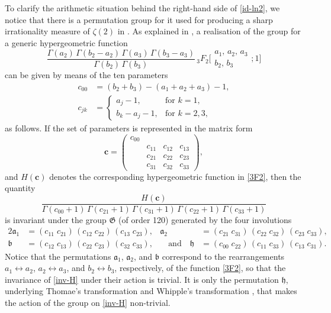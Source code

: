 \documentclass[12pt,reqno]{amsart}
\newcommand{\bc}{{\boldsymbol c}}
\newcommand{\fa}{{\mathfrak a}}
\newcommand{\fb}{{\mathfrak b}}
\newcommand{\fh}{{\mathfrak h}}
\newcommand{\fG}{{\mathfrak G}}
\begin{document}
To clarify the arithmetic situation behind the right-hand side of \eqref{id-ln2}, we notice that there is a permutation group for it
used for producing a sharp irrationality measure of $\zeta(2)$ in \cite{RV96}. As explained in \cite[Section~6]{Zu04},
a realisation of the group for a generic hypergeometric function
\begin{equation}
\frac{\Gamma(a_2)\,\Gamma(b_2-a_2)\,\Gamma(a_3)\,\Gamma(b_3-a_3)}{\Gamma(b_2)\,\Gamma(b_3)}
\,{}_3F_2\biggl[\begin{matrix} a_1, \, a_2, \, a_3 \\ b_2, \, b_3 \end{matrix}; 1\biggr]
\label{3F2}
\end{equation}
can be given by means of the ten parameters
\begin{align*}
c_{00}&=(b_2+b_3)-(a_1+a_2+a_3)-1,
\\
c_{jk}&=\begin{cases}
a_j-1, & \text{for }k=1, \\
b_k-a_j-1, & \text{for } k=2,3,
\end{cases}
\end{align*}
as follows. If the set of parameters is represented in the matrix form
\begin{equation}
\bc=\begin{pmatrix} c_{00} \\ & c_{11} & c_{12} & c_{13} \\ & c_{21} & c_{22} & c_{23} \\ & c_{31} & c_{32} & c_{33} \end{pmatrix},
\label{bc}
\end{equation}
and $H(\bc)$ denotes the corresponding hypergeometric function in \eqref{3F2}, then the quantity
\begin{equation}
\frac{H(\bc)}{\Gamma(c_{00}+1)\,\Gamma(c_{21}+1)\,\Gamma(c_{31}+1)\,\Gamma(c_{22}+1)\,\Gamma(c_{33}+1)}
\label{inv-H}
\end{equation}
is invariant under the group $\fG$ (of order 120) generated by the four involutions
\begin{alignat*}{2}
\fa_1&=(c_{11} \; c_{21})\,(c_{12} \; c_{22})\,(c_{13} \; c_{23}), &
\fa_2&=(c_{21} \; c_{31})\,(c_{22} \; c_{32})\,(c_{23} \; c_{33}), \\
\fb&=(c_{12} \; c_{13})\,(c_{22} \; c_{23})\,(c_{32} \; c_{33}), &\quad\text{and}\quad
\fh&=(c_{00} \; c_{22})\,(c_{11} \; c_{33})\,(c_{13} \; c_{31}).
\end{alignat*}
Notice that the permutations $\fa_1$, $\fa_2$, and $\fb$ correspond to the rearrangements $a_1\leftrightarrow a_2$, $a_2\leftrightarrow a_3$,
and $b_2\leftrightarrow b_3$, respectively, of the function \eqref{3F2}, so that the invariance of \eqref{inv-H} under their action
is trivial. It is only the permutation $\fh$, underlying Thomae's 
transformation
\cite[Sec.~3.2, Eq.~(1)]{Ba35} and Whipple's 
transformation \cite[Sec.~4.4, Eq.~(2)]{Ba35},
that makes the action of the group on \eqref{inv-H} non-trivial.
\end{document}
